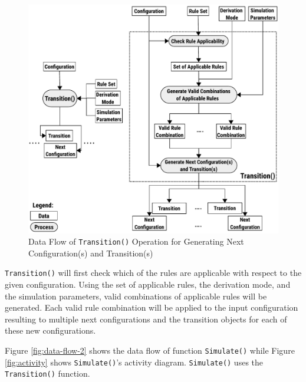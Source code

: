 \documentclass{article}
\begin{document}
\begin{figure}[H]
\begin{center}
\includegraphics[scale=1]{figures/zzz-data-flow.pdf}
\caption{Data Flow of \texttt{Transition()} Operation for Generating Next Configuration(s) and 
	Transition(s)}
\label{fig:data-flow}
\end{center}
\end{figure}

\texttt{Transition()} will first check which of the rules are applicable with respect to the 
given configuration. Using the set of applicable rules, the derivation mode, and the simulation
parameters, valid combinations of applicable rules will be generated. Each valid rule combination
will be applied to the input configuration resulting to multiple next configurations and the 
transition objects for each of these new configurations.

Figure \ref{fig:data-flow-2} shows the data flow of function \texttt{Simulate()} while Figure 
\ref{fig:activity} shows \texttt{Simulate()}'s activity diagram. \texttt{Simulate()} uses 
the \texttt{Transition()} function.
\end{document}
